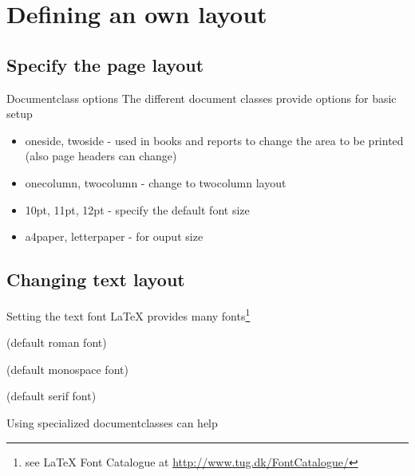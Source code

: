 \section{Defining an own layout}

\subsection{Specify the page layout}
\begin{frame}
	\begin{block}{Documentclass options}
		The different document classes provide options for basic setup
	\end{block}
	\begin{itemize}
		\item oneside, twoside - used in books and reports to change the area to be
			printed (also page headers can change)
		\item onecolumn, twocolumn - change to twocolumn layout
		\item 10pt, 11pt, 12pt - specify the default font size
		\item a4paper, letterpaper - for ouput size
	\end{itemize}
\end{frame}

\subsection{Changing text layout}
\begin{frame}
	\begin{block}{Setting the text font}
		{\LaTeX} provides many fonts\footnote{see {\LaTeX} Font Catalogue at \url{http://www.tug.dk/FontCatalogue/}}
	\end{block}
\end{frame}	
\begin{frame}
	\begin{mitemize}
		\item {} (default roman font)
		\item {} (default monospace font)
		\item {} (default serif font)
	\end{mitemize}
\end{frame}
\begin{frame}
\end{frame}
\begin{frame}
	Using specialized documentclasses can help
\end{frame}
\begin{frame}
\end{frame}
\begin{frame}
\end{frame}

